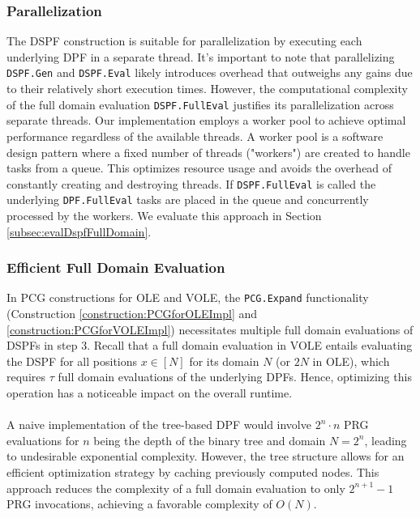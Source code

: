 \subsubsection{Parallelization}
The DSPF construction is suitable for parallelization by executing each underlying DPF in a separate thread. It's important to note that parallelizing \texttt{DSPF.Gen} and \texttt{DSPF.Eval}  likely introduces overhead that outweighs any gains due to their relatively short execution times. However, the computational complexity of the full domain evaluation \texttt{DSPF.FullEval} justifies its parallelization across separate threads. Our implementation employs a worker pool to achieve optimal performance regardless of the available threads. A worker pool is a software design pattern where a fixed number of threads ("workers") are created to handle tasks from a queue. This optimizes resource usage and avoids the overhead of constantly creating and destroying threads. If \texttt{DSPF.FullEval} is called the underlying \texttt{DPF.FullEval} tasks are placed in the queue and concurrently processed by the workers. We evaluate this approach in Section \ref{subsec:evalDspfFullDomain}.

\subsubsection{Efficient Full Domain Evaluation}
In PCG constructions for OLE and VOLE, the \texttt{PCG.Expand} functionality (Construction \ref{construction:PCGforOLEImpl} and \ref{construction:PCGforVOLEImpl}) necessitates multiple full domain evaluations of DSPFs in step 3. Recall that a full domain evaluation in VOLE entails evaluating the DSPF for all positions $x \in [N]$ for its domain $N$ (or $2N$ in OLE), which requires $\tau$ full domain evaluations of the underlying DPFs. Hence, optimizing this operation has a noticeable impact on the overall runtime. 
\\\\
A naive implementation of the tree-based DPF would involve $2^n\cdot n$ PRG evaluations for $n$ being the depth of the binary tree and domain $N = 2^n$, leading to undesirable exponential complexity. However, the tree structure allows for an efficient optimization strategy by caching previously computed nodes. This approach reduces the complexity of a full domain evaluation to only $2^{n+1}-1$ PRG invocations, achieving a favorable complexity of $O(N)$.

